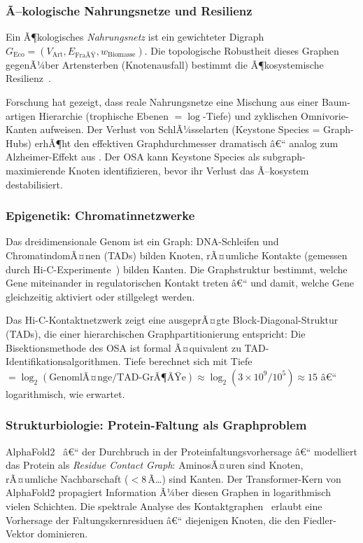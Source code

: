 ﻿\documentclass[12pt,a4paper,twoside]{article}
\theoremstyle{definition}
\theoremstyle{plain}
\theoremstyle{remark}
\begin{document}
\subsubsection{Ã–kologische Nahrungsnetze und Resilienz}

Ein Ã¶kologisches \emph{Nahrungsnetz} ist ein gewichteter
Digraph $G_{\text{Eco}} = (V_{\text{Art}}, E_{\text{FraÃŸ}}, w_{\text{Biomasse}})$.
Die topologische Robustheit dieses Graphen gegenÃ¼ber
Artensterben (Knotenausfall) bestimmt die Ã¶kosystemische
Resilienz~\cite{Dunne2002}.

Forschung hat gezeigt, dass reale Nahrungsnetze eine
Mischung aus einer Baum-artigen Hierarchie (trophische
Ebenen $= \log$-Tiefe) und zyklischen Omnivorie-Kanten aufweisen.
Der Verlust von SchlÃ¼sselarten (Keystone Species = Graph-Hubs)
erhÃ¶ht den effektiven Graphdurchmesser dramatisch â€“
analog zum Alzheimer-Effekt aus .
Der OSA kann Keystone Species als subgraph-maximierende
Knoten identifizieren, bevor ihr Verlust das Ã–kosystem destabilisiert.

\subsubsection{Epigenetik: Chromatinnetzwerke}

Das dreidimensionale Genom ist ein Graph: DNA-Schleifen und
ChromatindomÃ¤nen (TADs) bilden Knoten, rÃ¤umliche Kontakte
(gemessen durch Hi-C-Experimente~\cite{Lieberman2009}) bilden
Kanten.  Die Graphstruktur bestimmt, welche Gene miteinander
in regulatorischen Kontakt treten â€“ und damit, welche Gene
gleichzeitig aktiviert oder stillgelegt werden.

Das Hi-C-Kontaktnetzwerk zeigt eine ausgeprÃ¤gte
Block-Diagonal-Struktur (TADs), die einer hierarchischen
Graphpartitionierung entspricht: Die Bisektionsmethode des OSA
ist formal Ã¤quivalent zu TAD-Identifikationsalgorithmen.
Tiefe berechnet sich mit Tiefe $= \log_2(\text{GenomlÃ¤nge}/\text{TAD-GrÃ¶ÃŸe}) \approx
\log_2(3 \times 10^9 / 10^5) \approx 15$ â€“ logarithmisch, wie
erwartet.

\subsubsection{Strukturbiologie: Protein-Faltung als Graphproblem}

AlphaFold2~\cite{Jumper2021} â€“ der Durchbruch in der
Proteinfaltungsvorhersage â€“ modelliert das Protein als
\emph{Residue Contact Graph}: AminosÃ¤uren sind Knoten,
rÃ¤umliche Nachbarschaft ($< 8\,$Ã…) sind Kanten.
Der Transformer-Kern von AlphaFold2 propagiert Information
Ã¼ber diesen Graphen in logarithmisch vielen Schichten.
Die spektrale Analyse des Kontaktgraphen~\cite{Vendruscolo2002}
erlaubt eine Vorhersage der Faltungskernresiduen â€“
diejenigen Knoten, die den Fiedler-Vektor dominieren.
\end{document}
